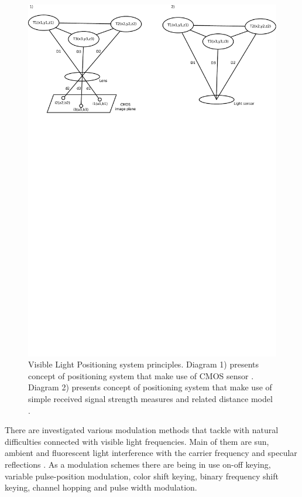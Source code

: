 \documentclass[../main.tex]{subfiles}
\begin{document}
\begin{figure}[!htbp]
\includegraphics[width=\textwidth, trim={0 20cm 0 0},clip]{pictures/visible_positioning.pdf}
\centering
\caption{Visible Light Positioning system principles. Diagram 1) presents concept of positioning system that make use of CMOS sensor  \cite{visible_light_positioning}. Diagram 2) presents concept of positioning system that make use of simple received signal strength measures and related distance model \cite{visible_light_positioning_epsilon}.}
\label{fig:visible_positioning}
\end{figure}

There are investigated various modulation methods that tackle with natural difficulties connected with visible light frequencies. Main of them are sun, ambient and fluorescent light interference with the carrier frequency and specular reflections \cite{visible_light_positioning}. As a modulation schemes there are being in use on-off keying, variable pulse-position modulation, color shift keying, binary frequency shift keying, channel hopping and pulse width modulation.
\end{document}

